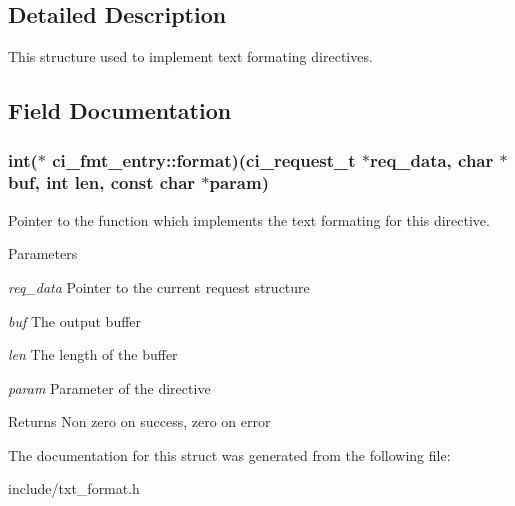 \subsection{Detailed Description}
This structure used to implement text formating directives. 

\subsection{Field Documentation}
\hypertarget{structci__fmt__entry_a7b7b8a391dd2f76a9f5e3262712a75a6}{
\subsubsection[{format}]{\setlength{\rightskip}{0pt plus 5cm}int($\ast$ {\bf ci\_\-fmt\_\-entry::format})({\bf ci\_\-request\_\-t} $\ast$req\_\-data, char $\ast$buf, int len, const char $\ast$param)}}
\label{structci__fmt__entry_a7b7b8a391dd2f76a9f5e3262712a75a6}


Pointer to the function which implements the text formating for this directive. 
\begin{DoxyParams}{Parameters}
\item[{\em req\_\-data}]Pointer to the current request structure \item[{\em buf}]The output buffer \item[{\em len}]The length of the buffer \item[{\em param}]Parameter of the directive \end{DoxyParams}
\begin{DoxyReturn}{Returns}
Non zero on success, zero on error 
\end{DoxyReturn}


The documentation for this struct was generated from the following file:\begin{DoxyCompactItemize}
\item 
include/txt\_\-format.h\end{DoxyCompactItemize}
